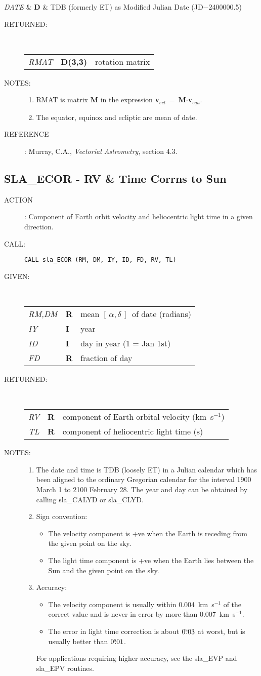 \documentclass[11pt,twoside]{article}
\newcommand{\xlabel}[1]{}
\newcommand{\radec}     {$[\,\alpha,\delta\,]$}
\newcommand{\tseci}[1]   {$#1$\mbox{$^{\rm s}$}}
\newcommand{\tsec}[2]    {\tseci{#1}$\hspace{-0.3em}.#2$}
\renewcommand{\tsec}[2] {$#1^{\rm s}\hspace{-0.3em}.#2$}
\newcommand{\routine}[3]
{\hbadness=10000
  \vbox
  {
    \rule{\textwidth}{0.3mm}\\
    {\Large {\bf #1} \hfill #2 \hfill {\bf #1}}\\
    \setlength{\oldspacing}{\topsep}
    \setlength{\topsep}{0.3ex}
    \begin{description}
      #3
    \end{description}
    \setlength{\topsep}{\oldspacing}
  }
}
\renewcommand{\routine}[3]
   {
      \subsection{#1\xlabel{#1} - #2\label{#1}}
       \begin{description}
         #3
       \end{description}
   }
\newcommand{\action}[1]
{\item[ACTION]: #1}
\newcommand{\action}[1]
   {\item[ACTION:] #1}
\newcommand{\call}[1]
{\item[CALL]: \hspace{0.4em}{\tt #1}}
\newlength{\oldspacing}
\renewcommand{\call}[1]
   {
    \item[CALL:] {\tt #1}
   }
\newcommand{\args}[2]
{
  \goodbreak
  \setlength{\oldspacing}{\topsep}
  \setlength{\topsep}{0.3ex}
  \begin{description}
  \item[#1]:\\[1.5ex]
    \begin{tabular}{p{7em}p{6em}p{22em}}
      #2
    \end{tabular}
  \end{description}
  \setlength{\topsep}{\oldspacing}
}
\renewcommand{\args}[2]
   {
     \begin{description}
        \item[#1:]\\
        \begin{tabular}{p{7em}p{6em}l}
           #2
        \end{tabular}
     \end{description}
   }
\newcommand{\spec}[3]
{
  {\em {#1}} & {\bf \mbox{#2}} & {#3}
}
\newcommand{\notes}[1]
{
  \goodbreak
  \setlength{\oldspacing}{\topsep}
  \setlength{\topsep}{0.3ex}
  \begin{description}
    \item[NOTES]:
        #1
  \end{description}
  \setlength{\topsep}{\oldspacing}
}
\renewcommand{\notes}[1]
   {
      \begin{description}
         \item[NOTES:]
            #1
      \end{description}
   }
\newcommand{\aref}[1]
{
  \goodbreak
  \setlength{\oldspacing}{\topsep}
  \setlength{\topsep}{0.3ex}
  \begin{description}
    \item[REFERENCE]:
        #1
  \end{description}
  \setlength{\topsep}{\oldspacing}
}
\newcommand{\aref}[1]
   {
     \begin{description}
       \item[REFERENCE:]
           #1
     \end{description}
   }
\begin{document}
{
 \spec{DATE}{D}{TDB (formerly ET) as Modified Julian Date
                                           (JD$-$2400000.5)}
}
\args{RETURNED}
{
 \spec{RMAT}{D(3,3)}{rotation matrix}
}
\notes
{
 \begin{enumerate}
  \item RMAT is matrix {\bf M} in the expression
        {\bf v}$_{ecl}$~=~{\bf M}$\cdot${\bf v}$_{equ}$.
  \item The equator, equinox and ecliptic are mean of date.
 \end{enumerate}
}
\aref{Murray, C.A., {\it Vectorial Astrometry}, section 4.3.}
\routine{SLA\_ECOR}{RV \& Time Corrns to Sun}
{
 \action{Component of Earth orbit velocity and heliocentric
         light time in a given direction.}
 \call{CALL sla\_ECOR (RM, DM, IY, ID, FD, RV, TL)}
}
\args{GIVEN}
{
 \spec{RM,DM}{R}{mean \radec\ of date (radians)} \\
 \spec{IY}{I}{year} \\
 \spec{ID}{I}{day in year (1 = Jan 1st)} \\
 \spec{FD}{R}{fraction of day}
}
\args{RETURNED}
{
 \spec{RV}{R}{component of Earth orbital velocity (km~s$^{-1}$)} \\
 \spec{TL}{R}{component of heliocentric light time (s)}
}
\notes
{
 \begin{enumerate}
  \item The date and time is TDB (loosely ET) in a Julian calendar
        which has been aligned to the ordinary Gregorian
        calendar for the interval 1900 March 1 to 2100 February 28.
        The year and day can be obtained by calling sla\_CALYD or
        sla\_CLYD.
  \item Sign convention:
        \begin{itemize}
         \item The velocity component is +ve when the
               Earth is receding from
               the given point on the sky.
         \item The light time component is +ve
               when the Earth lies between the Sun and
               the given point on the sky.
        \end{itemize}
 \item Accuracy:
       \begin{itemize}
        \item The velocity component is usually within 0.004~km~s$^{-1}$
              of the correct value and is never in error by more than
              0.007~km~s$^{-1}$.
        \item The error in light time correction is about
              \tsec{0}{03} at worst,
              but is usually better than \tsec{0}{01}.
       \end{itemize}
       For applications requiring higher accuracy, see the sla\_EVP
       and sla\_EPV routines.
 \end{enumerate}
}
\end{document}
